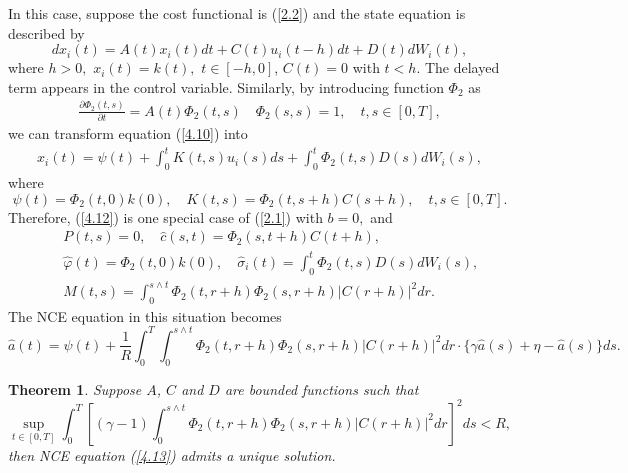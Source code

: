 \documentclass[11pt]{article}
\newtheorem{theorem}{Theorem}[section]
\begin{document}
In this case, suppose the cost functional is (\ref{2.2}) and the
state equation is described by
%
\begin{equation}\label{4.10}
dx_{i}(t)=A(t)x_{i}(t)dt+C(t)u_i(t-h)dt+D(t)dW_i(t),
\end{equation}
%
where $h>0,$ $x_{i}(t)=k(t),$ $t\in [-h,0]$, $C(t)=0$ with $t<h.$
The delayed term appears in the control variable. Similarly, by
introducing function $\Phi_2 $ as
%
\begin{eqnarray}\label{4.11}
\frac{\partial \Phi_2(t,s)}{\partial t} =A(t)\Phi_2(t,s) \quad
\Phi_2(s,s) =1,\quad t,s\in[0,T],
\end{eqnarray}
%
we can transform equation (\ref{4.10}) into
%
\begin{eqnarray}\label{4.12}
x_{i}(t)=\psi(t)+\int_{0}^{t}K(t,s)u_i(s)ds+\int_{0}^{t}\Phi_2(t,s)D(s)dW_i(s),
\end{eqnarray}
%
where
%
\[
\psi(t)=\Phi_2(t,0)k(0), \quad K(t,s)=\Phi_2(t,s+h)C(s+h), \quad t,s\in[0,T].
\]
%
Therefore, (\ref{4.12}) is one special case of (\ref{2.1}) with $b=0,$ and
%
\begin{eqnarray*}
& & P(t,s) = 0,\quad \widehat{c}(s,t)=\Phi_2(s,t+h)C(t+h), \\
& & \widehat{\varphi }(t) = \Phi_2(t,0)k(0),\quad \widehat{\sigma }_i(t)=\int_{0}^{t}\Phi_2(t,s)D(s)dW_{i}(s),\\
& & M(t,s) = \int_{0}^{s\wedge t}\Phi_2(t,r+h)\Phi_2(s,r+h)|C(r+h)|^{2}dr.
\end{eqnarray*}
%
The NCE equation in this situation becomes
\begin{equation}\label{4.13}
\widehat{a}(t)=\psi (t)+\frac{1}{R}\int_{0}^{T}\int_{0}^{s\wedge
t}\Phi_2(t,r+h)\Phi_2(s,r+h)|C(r+h)|^{2}dr \cdot
\big\{\gamma\widehat{a}(s)+\eta-\widehat{a}(s)\big\}ds.
\end{equation}
%

\begin{theorem}\label{theorem4-5}
Suppose $A$, $C$ and $D$ are bounded functions such that
\[
\sup_{t\in [0,T]}\int_{0}^{T}\left[ (\gamma -1)\int_{0}^{s\wedge
t}\Phi_2(t,r+h)\Phi_2(s,r+h)|C(r+h)|^{2}dr \right] ^{2}ds<R,
\]%
then NCE equation (\ref{4.13}) admits a unique solution.
\end{theorem}
\end{document}

